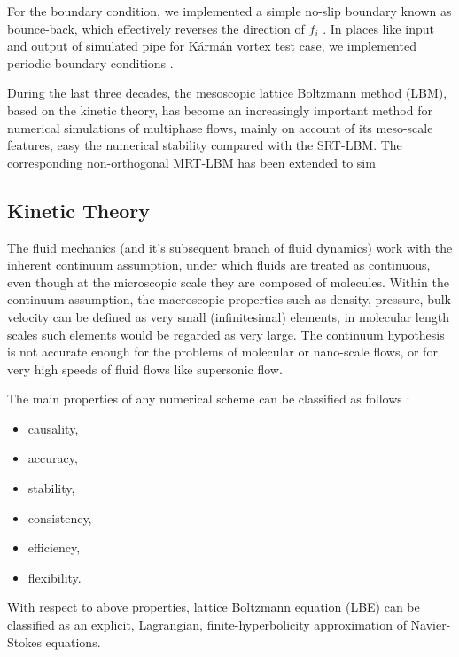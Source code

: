 For the boundary condition, we implemented a simple no-slip boundary known as bounce-back, which effectively reverses the direction of $f_i$ \cite{Mawson2014InteractiveFI}. In places like input and output of simulated pipe for Kármán vortex test case, we implemented periodic boundary conditions \cite{succi2018lattice}.

During the last three decades, the mesoscopic lattice Boltzmann method (LBM), based on the kinetic theory, has become an increasingly important method for numerical simulations of multiphase flows, mainly on account of its meso-scale features, easy the numerical stability compared with the SRT-LBM. The corresponding non-orthogonal MRT-LBM has been extended to sim 


\subsection{Kinetic Theory}

The fluid mechanics (and it's subsequent branch of fluid dynamics) work with the inherent continuum assumption, under which fluids are treated as continuous, even though at the microscopic scale they are composed of molecules. Within the continuum assumption, the macroscopic properties such as density, pressure, bulk velocity can be defined as very small (infinitesimal) elements, in molecular length scales such elements would be regarded as very large. The continuum hypothesis is not accurate enough for the problems of molecular or nano-scale flows, or for very high speeds of fluid flows like supersonic flow.

The main properties of any numerical scheme can be classified as follows \citep{succi2001lattice}:

\begin{itemize}
	\item causality,
	\item accuracy,
	\item stability,
	\item consistency,
	\item efficiency,
	\item flexibility. 
\end{itemize}

With respect to above properties, lattice Boltzmann equation (LBE) can be classified as an explicit, Lagrangian, finite-hyperbolicity approximation of Navier-Stokes equations. 


